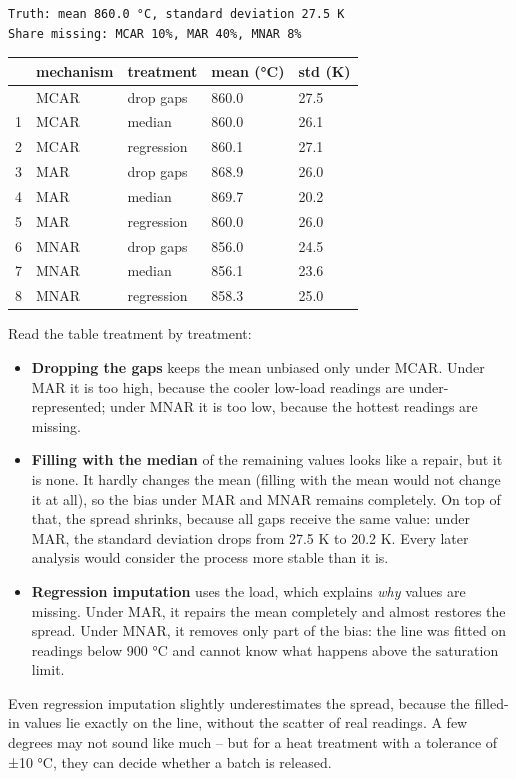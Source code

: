 \documentclass[
  letterpaper,
  DIV=11,
  numbers=noendperiod]{scrreprt}
\providecommand{\tightlist}{%
  \setlength{\itemsep}{0pt}\setlength{\parskip}{0pt}}\usepackage{longtable,booktabs,array}
\begin{document}
\begin{tcolorbox}
\begin{verbatim}
Truth: mean 860.0 °C, standard deviation 27.5 K
Share missing: MCAR 10%, MAR 40%, MNAR 8%
\end{verbatim}

\begin{longtable}[]{@{}lllll@{}}
\toprule\noalign{}
& mechanism & treatment & mean (°C) & std (K) \\
\midrule\noalign{}
\endhead
\bottomrule\noalign{}
\endlastfoot
0 & MCAR & drop gaps & 860.0 & 27.5 \\
1 & MCAR & median & 860.0 & 26.1 \\
2 & MCAR & regression & 860.1 & 27.1 \\
3 & MAR & drop gaps & 868.9 & 26.0 \\
4 & MAR & median & 869.7 & 20.2 \\
5 & MAR & regression & 860.0 & 26.0 \\
6 & MNAR & drop gaps & 856.0 & 24.5 \\
7 & MNAR & median & 856.1 & 23.6 \\
8 & MNAR & regression & 858.3 & 25.0 \\
\end{longtable}

Read the table treatment by treatment:

\begin{itemize}
\tightlist
\item
  \textbf{Dropping the gaps} keeps the mean unbiased only under MCAR.
  Under MAR it is too high, because the cooler low-load readings are
  under-represented; under MNAR it is too low, because the hottest
  readings are missing.
\item
  \textbf{Filling with the median} of the remaining values looks like a
  repair, but it is none. It hardly changes the mean (filling with the
  mean would not change it at all), so the bias under MAR and MNAR
  remains completely. On top of that, the spread shrinks, because all
  gaps receive the same value: under MAR, the standard deviation drops
  from 27.5 K to 20.2 K. Every later analysis would consider the process
  more stable than it is.
\item
  \textbf{Regression imputation} uses the load, which explains
  \emph{why} values are missing. Under MAR, it repairs the mean
  completely and almost restores the spread. Under MNAR, it removes only
  part of the bias: the line was fitted on readings below 900 °C and
  cannot know what happens above the saturation limit.
\end{itemize}

Even regression imputation slightly underestimates the spread, because
the filled-in values lie exactly on the line, without the scatter of
real readings. A few degrees may not sound like much -- but for a heat
treatment with a tolerance of ±10 °C, they can decide whether a batch is
released.

\end{tcolorbox}
\end{document}

